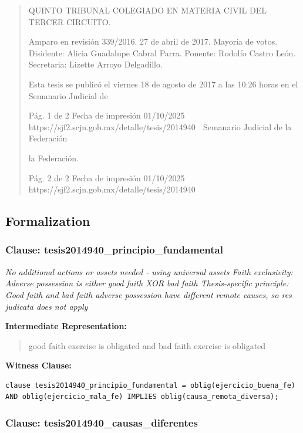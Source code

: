 \documentclass[11pt,a4paper]{article}
\begin{document}
\begin{quote}
QUINTO TRIBUNAL COLEGIADO EN MATERIA CIVIL DEL TERCER CIRCUITO.


Amparo en revisión 339/2016. 27 de abril de 2017. Mayoría de votos. Disidente: Alicia Guadalupe
Cabral Parra. Ponente: Rodolfo Castro León. Secretaria: Lizette Arroyo Delgadillo.


Esta tesis se publicó el viernes 18 de agosto de 2017 a las 10:26 horas en el Semanario Judicial de


                                              Pág. 1 de 2             Fecha de impresión 01/10/2025
  https://sjf2.scjn.gob.mx/detalle/tesis/2014940
                                                  Semanario Judicial de la Federación

la Federación.




                                             Pág. 2 de 2       Fecha de impresión 01/10/2025
 https://sjf2.scjn.gob.mx/detalle/tesis/2014940

\end{quote}

\subsection{Formalization}

\subsubsection{Clause: tesis2014940\_principio\_fundamental}

\textit{No additional actions or assets needed - using universal assets Faith exclusivity: Adverse possession is either good faith XOR bad faith Thesis-specific principle: Good faith and bad faith adverse possession have different remote causes, so res judicata does not apply}

\textbf{Intermediate Representation:}

\begin{quote}
good faith exercise is obligated and bad faith exercise is obligated
\end{quote}

\textbf{Witness Clause:}

\begin{lstlisting}[style=witnessstyle, language=Witness]
clause tesis2014940_principio_fundamental = oblig(ejercicio_buena_fe) AND oblig(ejercicio_mala_fe) IMPLIES oblig(causa_remota_diversa);
\end{lstlisting}

\subsubsection{Clause: tesis2014940\_causas\_diferentes}
\end{document}
